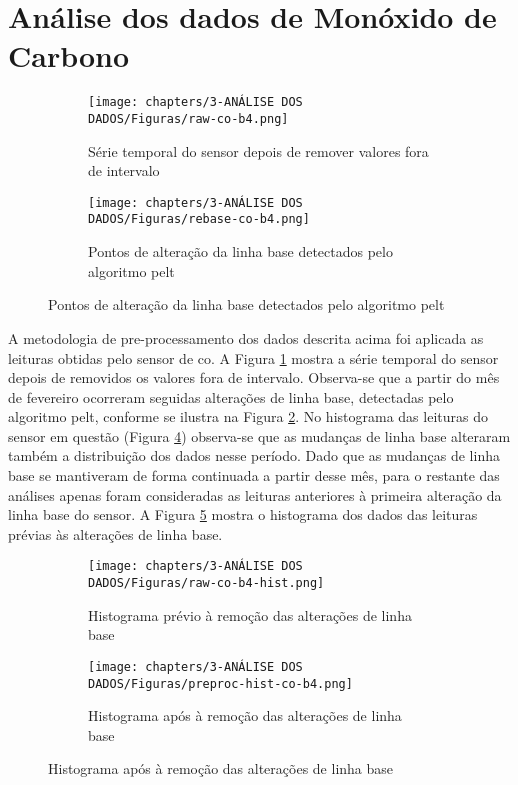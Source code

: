 \section{Análise dos dados de Monóxido de Carbono}

\begin{figure}[h]
    \centering
    \caption{Série temporal do sensor CO-B4}
    \begin{subfigure}{0.495\textwidth}
        \texttt{[image: chapters/3-ANÁLISE DOS DADOS/Figuras/raw-co-b4.png]}
        \caption{Série temporal do sensor depois de remover valores fora de intervalo}
        \label{fig:data-co-raw}
    \end{subfigure}
    \hfill
    \begin{subfigure}{0.495\textwidth}
        \texttt{[image: chapters/3-ANÁLISE DOS DADOS/Figuras/rebase-co-b4.png]}
        \caption{Pontos de alteração da linha base detectados pelo algoritmo \acrshort{pelt}}
        \label{fig:data-rebase-co}
    \end{subfigure}
    \hfill
    \label{fig:data-co-raw-and-pelt}
\end{figure}

A metodologia de pre-processamento dos dados descrita acima foi aplicada as leituras obtidas pelo sensor de \acrshort{co}. A Figura \ref{fig:data-co-raw} mostra a série temporal do sensor depois de removidos os valores fora de intervalo. Observa-se que a partir do mês de fevereiro ocorreram seguidas alterações de linha base, detectadas pelo algoritmo \acrshort{pelt}, conforme se ilustra na Figura \ref{fig:data-rebase-co}. No histograma das leituras do sensor em questão (Figura \ref{fig:data-co-raw-hist}) observa-se que as mudanças de linha base alteraram também a distribuição dos dados nesse período. Dado que as mudanças de linha base se mantiveram de forma continuada a partir desse mês, para o restante das análises apenas foram consideradas as leituras anteriores à primeira alteração da linha base do sensor. A Figura \ref{fig:data-co-preproc-hist} mostra o histograma dos dados das leituras prévias às alterações de linha base.

\begin{figure}[h]
    \centering
    \caption{Histograma das leituras do sensor CO-B4}
    \begin{subfigure}{0.4\textwidth}
        \texttt{[image: chapters/3-ANÁLISE DOS DADOS/Figuras/raw-co-b4-hist.png]}
        \caption{Histograma prévio à remoção das alterações de linha base}
        \label{fig:data-co-raw-hist}
    \end{subfigure}
    \hfill
    \begin{subfigure}{0.4\textwidth}
        \texttt{[image: chapters/3-ANÁLISE DOS DADOS/Figuras/preproc-hist-co-b4.png]}
        \caption{Histograma após à remoção das alterações de linha base}
        \label{fig:data-co-preproc-hist}
    \end{subfigure}
    \hfill
    \label{fig:data-co-hist}
\end{figure}

